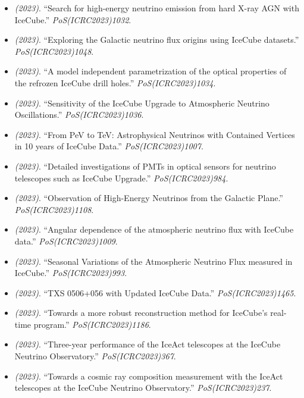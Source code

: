 \begin{itemize}
\item \textit{(2023)}. ``Search for high-energy neutrino emission from hard X-ray AGN with IceCube.'' \textit{PoS(ICRC2023)1032}.  
\item \textit{(2023)}. ``Exploring the Galactic neutrino flux origins using IceCube datasets.'' \textit{PoS(ICRC2023)1048}.  
\item \textit{(2023)}. ``A model independent parametrization of the optical properties of the refrozen IceCube drill holes.'' \textit{PoS(ICRC2023)1034}.  
\item \textit{(2023)}. ``Sensitivity of the IceCube Upgrade to Atmospheric Neutrino Oscillations.'' \textit{PoS(ICRC2023)1036}.  
\item \textit{(2023)}. ``From PeV to TeV: Astrophysical Neutrinos with Contained Vertices in 10 years of IceCube Data.'' \textit{PoS(ICRC2023)1007}.  
\item \textit{(2023)}. ``Detailed investigations of PMTs in optical sensors for neutrino telescopes such as IceCube Upgrade.'' \textit{PoS(ICRC2023)984}.  
\item \textit{(2023)}. ``Observation of High-Energy Neutrinos from the Galactic Plane.'' \textit{PoS(ICRC2023)1108}.  
\item \textit{(2023)}. ``Angular dependence of the atmospheric neutrino flux with IceCube data.'' \textit{PoS(ICRC2023)1009}.  
\item \textit{(2023)}. ``Seasonal Variations of the Atmospheric Neutrino Flux measured in IceCube.'' \textit{PoS(ICRC2023)993}.  
\item \textit{(2023)}. ``TXS 0506+056 with Updated IceCube Data.'' \textit{PoS(ICRC2023)1465}.  
\item \textit{(2023)}. ``Towards a more robust reconstruction method for IceCube's real-time program.'' \textit{PoS(ICRC2023)1186}.  
\item \textit{(2023)}. ``Three-year performance of the IceAct telescopes at the IceCube Neutrino Observatory.'' \textit{PoS(ICRC2023)367}.  
\item \textit{(2023)}. ``Towards a cosmic ray composition measurement with the IceAct telescopes at the IceCube Neutrino Observatory.'' \textit{PoS(ICRC2023)237}.  

\end{itemize}
